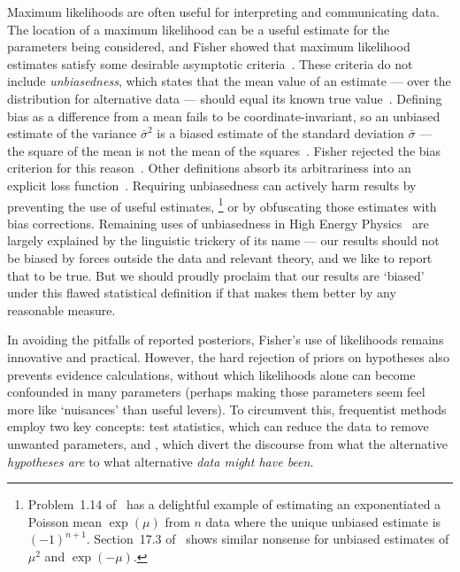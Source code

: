 Maximum likelihoods are often useful for interpreting and communicating data.
The location of a maximum likelihood can be a useful estimate for the
parameters being considered, and Fisher showed that maximum likelihood
estimates satisfy some desirable asymptotic
criteria~\cite{fisher1922estimators}.
These criteria do not include \emph{unbiasedness}, which states that the mean
value of an estimate --- over the distribution for alternative data --- should
equal its known true value~\cite{
sheynin1989aa,
Neyman1937Outline,
pdg2022ynf
}.
Defining bias as a difference from a mean fails to be coordinate-invariant,
so an unbiased estimate of the variance $\bar{\sigma}^2$ is a biased
estimate of the standard deviation $\bar{\sigma}$ --- the square of the mean
is not the mean of the squares~\cite{barlow2019svl}.
Fisher rejected the bias criterion for this
reason~\cite{jaynes2003probability}.
Other definitions absorb its
arbitrariness into an explicit loss function~\cite{lehmann2005testing}.
Requiring unbiasedness can actively harm results by preventing the use of
useful estimates,%
\footnote{%
Problem~1.14 of~\cite{lehmann2005testing} has a delightful example of
estimating an exponentiated a Poisson mean $\exp(\mu)$ from $n$ data
where the unique unbiased estimate is $(-1)^{n + 1}$.
Section~17.3 of~\cite{jaynes2003probability} shows similar nonsense for
unbiased estimates of $\mu^2$ and $\exp(-\mu)$.%
}
or by obfuscating those estimates with bias corrections.
Remaining uses of unbiasedness in High Energy Physics~\cite{
pdg2022ynf,
Tullythesis,
lhcb2018563,
LHCb:2021trn,
LHCb:2015yax
}
are largely explained by the linguistic trickery of its name --- our
results should not be biased by forces outside the data and relevant theory,
and we like to report that to be true.
But we should proudly proclaim that our results are `biased' under this flawed
statistical definition if that makes them better by any reasonable measure.

In avoiding the pitfalls of reported posteriors, Fisher's use of likelihoods
remains innovative and practical.
However, the hard rejection of priors on hypotheses also prevents evidence
calculations, without which likelihoods alone can become confounded in many
parameters
(perhaps making those parameters seem feel more like `nuisances'
than useful levers).
To circumvent this, frequentist methods employ two key concepts:
test statistics, which can reduce the data to remove unwanted parameters,
and \pvalues, which divert the discourse
from what the alternative \emph{hypotheses are}
to what alternative \emph{data might have been}.

